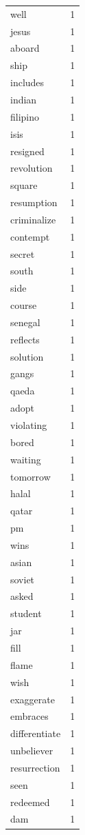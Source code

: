 \begin{tabular}{lr}
well & 1 \\
jesus & 1 \\
aboard & 1 \\
ship & 1 \\
includes & 1 \\
indian & 1 \\
filipino & 1 \\
isis & 1 \\
resigned & 1 \\
revolution & 1 \\
square & 1 \\
resumption & 1 \\
criminalize & 1 \\
contempt & 1 \\
secret & 1 \\
south & 1 \\
side & 1 \\
course & 1 \\
senegal & 1 \\
reflects & 1 \\
solution & 1 \\
gangs & 1 \\
qaeda & 1 \\
adopt & 1 \\
violating & 1 \\
bored & 1 \\
waiting & 1 \\
tomorrow & 1 \\
halal & 1 \\
qatar & 1 \\
pm & 1 \\
wins & 1 \\
asian & 1 \\
soviet & 1 \\
asked & 1 \\
student & 1 \\
jar & 1 \\
fill & 1 \\
flame & 1 \\
wish & 1 \\
exaggerate & 1 \\
embraces & 1 \\
differentiate & 1 \\
unbeliever & 1 \\
resurrection & 1 \\
seen & 1 \\
redeemed & 1 \\
dam & 1 \\

\end{tabular}
